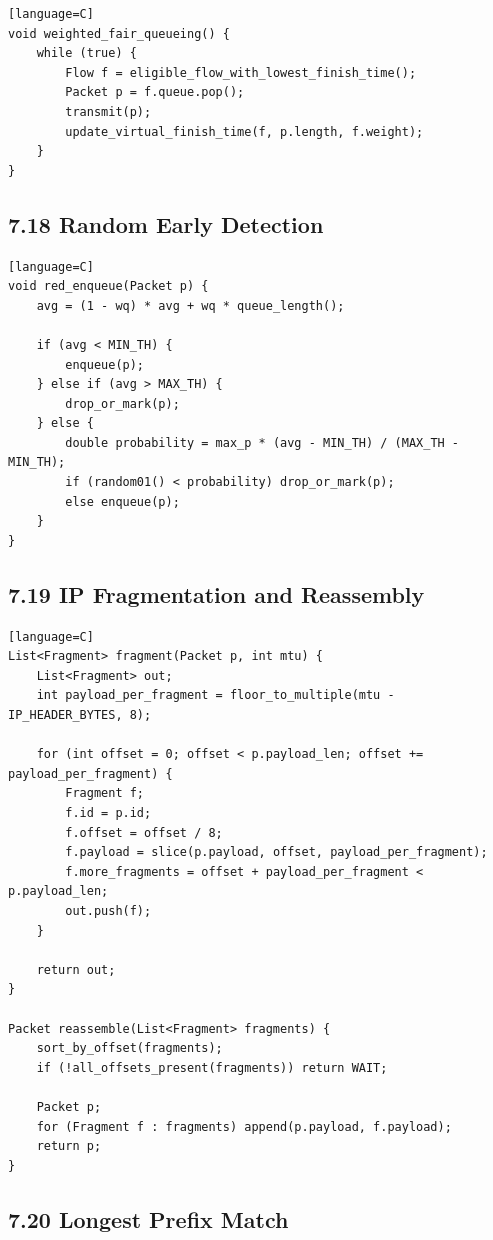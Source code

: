 \documentclass[11pt]{article}
\begin{document}
\begin{verbatim}[language=C]
void weighted_fair_queueing() {
    while (true) {
        Flow f = eligible_flow_with_lowest_finish_time();
        Packet p = f.queue.pop();
        transmit(p);
        update_virtual_finish_time(f, p.length, f.weight);
    }
}
\end{verbatim}

\subsection{7.18 Random Early Detection}\label{random-early-detection}

\begin{verbatim}[language=C]
void red_enqueue(Packet p) {
    avg = (1 - wq) * avg + wq * queue_length();

    if (avg < MIN_TH) {
        enqueue(p);
    } else if (avg > MAX_TH) {
        drop_or_mark(p);
    } else {
        double probability = max_p * (avg - MIN_TH) / (MAX_TH - MIN_TH);
        if (random01() < probability) drop_or_mark(p);
        else enqueue(p);
    }
}
\end{verbatim}

\subsection{7.19 IP Fragmentation and
Reassembly}\label{ip-fragmentation-and-reassembly}

\begin{verbatim}[language=C]
List<Fragment> fragment(Packet p, int mtu) {
    List<Fragment> out;
    int payload_per_fragment = floor_to_multiple(mtu - IP_HEADER_BYTES, 8);

    for (int offset = 0; offset < p.payload_len; offset += payload_per_fragment) {
        Fragment f;
        f.id = p.id;
        f.offset = offset / 8;
        f.payload = slice(p.payload, offset, payload_per_fragment);
        f.more_fragments = offset + payload_per_fragment < p.payload_len;
        out.push(f);
    }

    return out;
}

Packet reassemble(List<Fragment> fragments) {
    sort_by_offset(fragments);
    if (!all_offsets_present(fragments)) return WAIT;

    Packet p;
    for (Fragment f : fragments) append(p.payload, f.payload);
    return p;
}
\end{verbatim}

\subsection{7.20 Longest Prefix Match}\label{longest-prefix-match}
\end{document}
